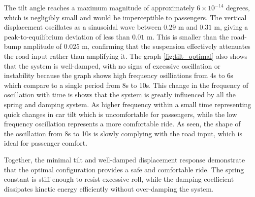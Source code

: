 The tilt angle reaches a maximum magnitude of approximately $6 \times 10^{-14}$ degrees, which is negligibly small and would be imperceptible to passengers. The vertical displacement oscillates as a sinusoidal wave between $0.29$ m and $0.31$ m, giving a peak-to-equilibrium deviation of less than $0.01$ m. This is smaller than the road-bump amplitude of $0.025$ m, confirming that the suspension effectively attenuates the road input rather than amplifying it. The graph \ref{fig:tilt_optimal} also shows that the system is well-damped, with no signs of excessive oscillation or instability because the graph shows high frequency osilliations from 4s to 6s which compare to a single period from 8s to 10s. This change in the frequency of oscillation with time is shows that the system is greatly influenced by all the spring and damping system. As higher frequency within a small time representing quick changes in car tilt which is uncomfortable for passengers, while the low frequency oscillation represents a more comfortable ride. As seen, the shape of the oscillation from 8s to 10s is slowly complying with the road input, which is ideal for passenger comfort.

Together, the minimal tilt and well-damped displacement response demonstrate that the optimal configuration provides a safe and comfortable ride. The spring constant is stiff enough to resist excessive roll, while the damping coefficient dissipates kinetic energy efficiently without over-damping the system.
